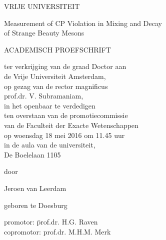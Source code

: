 \thispagestyle{empty}

\begin{center}


VRIJE UNIVERSITEIT


{\Large
Measurement of CP Violation in Mixing and Decay\\
of Strange Beauty Mesons}


ACADEMISCH PROEFSCHRIFT


ter verkrijging van de graad Doctor aan\\
de Vrije Universiteit Amsterdam,\\
op gezag van de rector magnificus\\
prof.dr. V. Subramaniam,\\
in het openbaar te verdedigen\\
ten overstaan van de promotiecommissie\\
van de Faculteit der Exacte Wetenschappen\\
op woensdag 18 mei 2016 om 11.45 uur\\
in de aula van de universiteit,\\
De Boelelaan 1105


door


Jeroen van Leerdam


geboren te Doesburg


\end{center}

\newpage
\thispagestyle{empty}

\begin{tabbing}
  promotor:    \hspace{30pt}\=  prof.dr. H.G. Raven  \\
  copromotor:               \>  prof.dr. M.H.M. Merk
\end{tabbing}

\newpage
\cleardoublepage
